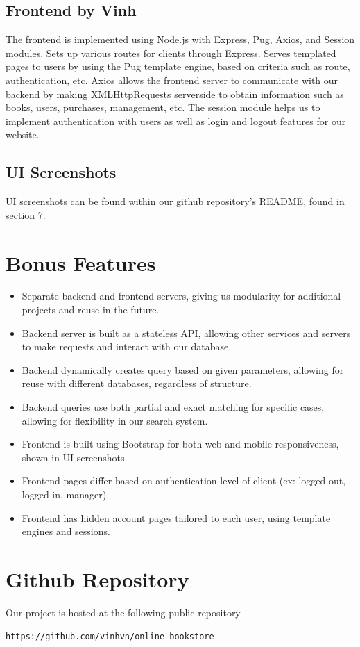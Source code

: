 \documentclass{article}
\begin{document}
    \subsection{Frontend by Vinh}
    
    The frontend is implemented using Node.js with Express, Pug, Axios, and Session modules. Sets up various routes for clients through Express. Serves templated pages to users by using the Pug template engine, based on criteria such as route, authentication, etc. Axios allows the frontend server to communicate with our backend by making XMLHttpRequests serverside to obtain information such as books, users, purchases, management, etc. The session module helps us to implement authentication with users as well as login and logout features for our website.
    
    \subsection{UI Screenshots}
    
    \noindent UI screenshots can be found within our github repository's README, found in \hyperref[sec:github]{section 7}.

    \section{Bonus Features}

    \begin{itemize}
        \item Separate backend and frontend servers, giving us modularity for additional projects and reuse in the future.
        \item Backend server is built as a stateless API, allowing other services and servers to make requests and interact with our database.
        \item Backend dynamically creates query based on given parameters, allowing for reuse with different databases, regardless of structure.
        \item Backend queries use both partial and exact matching for specific cases, allowing for flexibility in our search system.
        \item Frontend is built using Bootstrap for both web and mobile responsiveness, shown in UI screenshots.
        \item Frontend pages differ based on authentication level of client (ex: logged out, logged in, manager).
        \item Frontend has hidden account pages tailored to each user, using template engines and sessions.
    \end{itemize}

    \section{Github Repository}
    \label{sec:github}

    Our project is hosted at the following public repository
    \begin{verbatim}
https://github.com/vinhvn/online-bookstore
    \end{verbatim}
\end{document}
